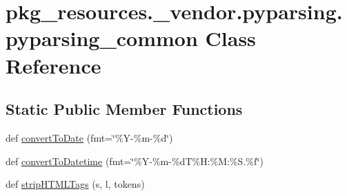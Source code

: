 \hypertarget{classpkg__resources_1_1__vendor_1_1pyparsing_1_1pyparsing__common}{}\section{pkg\+\_\+resources.\+\_\+vendor.\+pyparsing.\+pyparsing\+\_\+common Class Reference}
\label{classpkg__resources_1_1__vendor_1_1pyparsing_1_1pyparsing__common}
\subsection*{Static Public Member Functions}
\begin{DoxyCompactItemize}
\item 
def \hyperlink{classpkg__resources_1_1__vendor_1_1pyparsing_1_1pyparsing__common_a467e847f52d14bf50acf1a88ca4e7cfa}{convert\+To\+Date} (fmt=\char`\"{}\%Y-\/\%m-\/\%d\char`\"{})
\item 
def \hyperlink{classpkg__resources_1_1__vendor_1_1pyparsing_1_1pyparsing__common_a1214390f27ef7e9a518c29324df6a249}{convert\+To\+Datetime} (fmt=\char`\"{}\%Y-\/\%m-\/\%dT\%H\+:\%M\+:\%S.\%f\char`\"{})
\item 
def \hyperlink{classpkg__resources_1_1__vendor_1_1pyparsing_1_1pyparsing__common_a4dd54208324410014764484cd051cc00}{strip\+H\+T\+M\+L\+Tags} (s, l, tokens)
\end{DoxyCompactItemize}
